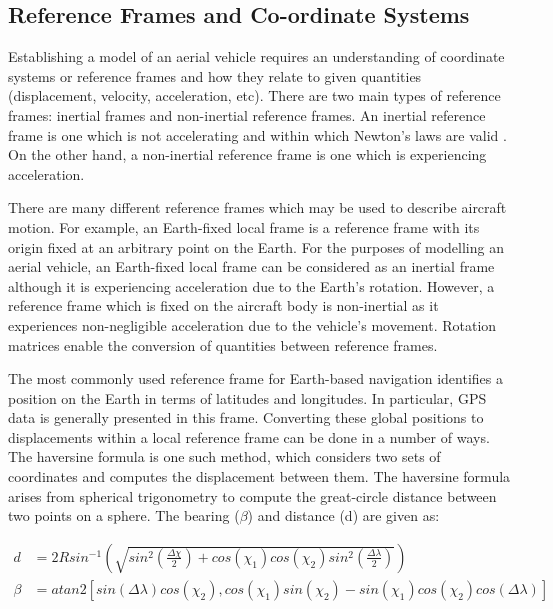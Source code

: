 \subsection{Reference Frames and Co-ordinate Systems}\label{section:RefFrames}
Establishing a model of an aerial vehicle requires an understanding of coordinate systems or reference frames and how they relate to given quantities (displacement, velocity, acceleration, etc). There are two main types of reference frames: inertial frames and non-inertial reference frames. An inertial reference frame is one which is not accelerating and within which Newton's laws are valid \cite{Nebylov2016}. On the other hand, a non-inertial reference frame is one which is experiencing acceleration.

There are many different reference frames which may be used to describe aircraft motion. For example, an Earth-fixed local frame is a reference frame with its origin fixed at an arbitrary point on the Earth. For the purposes of modelling an aerial vehicle, an Earth-fixed local frame can be considered as an inertial frame although it is experiencing acceleration due to the Earth's rotation. However, a reference frame which is fixed on the aircraft body is non-inertial as it experiences non-negligible acceleration due to the vehicle's movement. Rotation matrices enable the conversion of quantities between reference frames.

The most commonly used reference frame for Earth-based navigation identifies a position on the Earth in terms of latitudes and longitudes. In particular, GPS data is generally presented in this frame. Converting these global positions to displacements within a local reference frame can be done in a number of ways. The haversine formula is one such method, which considers two sets of coordinates and computes the displacement between them. The haversine formula arises from spherical trigonometry to compute the great-circle distance between two points on a sphere. The bearing ($\beta$) and distance (d) are given as:

\begin{equation}\label{eqn:haversine}
\begin{split}
d&=2R sin^{-1} \left( \sqrt{sin^{2}\left( \frac{\Delta\chi}{2} \right) +cos(\chi_{1})cos(\chi_{2})sin^{2} \left( \frac{\Delta\lambda}{2}  \right) }\right)\\
\beta&=atan2\left[ sin(\Delta\lambda)cos(\chi_{2}) , cos(\chi_{1})sin(\chi_{2}) - sin(\chi_{1}) cos(\chi_2) cos(\Delta\lambda)\right]
\end{split}
\end{equation}

